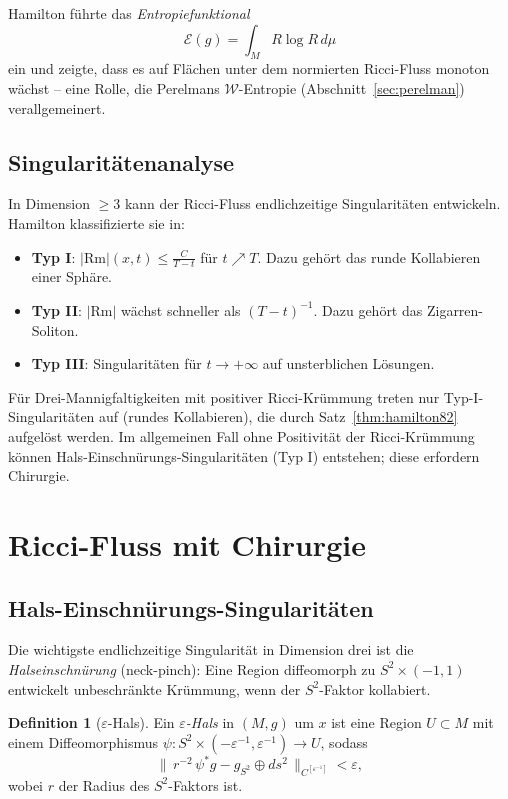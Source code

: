 \documentclass[12pt,a4paper]{amsart}
\theoremstyle{definition}
\newtheorem{definition}[theorem]{Definition}
\theoremstyle{remark}
\newcommand{\Rm}{\mathrm{Rm}}
\begin{document}
Hamilton führte das \emph{Entropiefunktional}
\[
  \mathcal{E}(g) = \int_M R \log R\, d\mu
\]
ein und zeigte, dass es auf Flächen unter dem normierten Ricci-Fluss monoton
wächst -- eine Rolle, die Perelmans $\mathcal{W}$-Entropie
(Abschnitt~\ref{sec:perelman}) verallgemeinert.

\subsection{Singularitätenanalyse}

In Dimension $\geq 3$ kann der Ricci-Fluss endlichzeitige Singularitäten
entwickeln.  Hamilton klassifizierte sie in:
\begin{itemize}
  \item \textbf{Typ I}: $|\Rm|(x,t) \leq \frac{C}{T-t}$ für $t \nearrow T$.
    Dazu gehört das runde Kollabieren einer Sphäre.
  \item \textbf{Typ II}: $|\Rm|$ wächst schneller als $(T-t)^{-1}$.
    Dazu gehört das Zigarren-Soliton.
  \item \textbf{Typ III}: Singularitäten für $t \to +\infty$ auf unsterblichen
    Lösungen.
\end{itemize}
Für Drei-Mannigfaltigkeiten mit positiver Ricci-Krümmung treten nur
Typ-I-Singularitäten auf (rundes Kollabieren), die durch
Satz~\ref{thm:hamilton82} aufgelöst werden.  Im allgemeinen Fall ohne
Positivität der Ricci-Krümmung können Hals-Einschnürungs-Singularitäten
(Typ I) entstehen; diese erfordern Chirurgie.


\section{Ricci-Fluss mit Chirurgie}
\label{sec:chirurgie}

\subsection{Hals-Einschnürungs-Singularitäten}

Die wichtigste endlichzeitige Singularität in Dimension drei ist die
\emph{Halseinschnürung} (neck-pinch): Eine Region diffeomorph zu
$S^2 \times (-1,1)$ entwickelt unbeschränkte Krümmung, wenn der
$S^2$-Faktor kollabiert.

\begin{definition}[$\varepsilon$-Hals]
Ein \emph{$\varepsilon$-Hals} in $(M,g)$ um $x$ ist eine Region
$U \subset M$ mit einem Diffeomorphismus $\psi: S^2 \times (-\varepsilon^{-1},
\varepsilon^{-1}) \to U$, sodass
\[
  \bigl\|\, r^{-2}\,\psi^*g - g_{S^2} \oplus ds^2 \,\bigr\|_{C^{[\varepsilon^{-1}]}} < \varepsilon,
\]
wobei $r$ der Radius des $S^2$-Faktors ist.
\end{definition}
\end{document}
